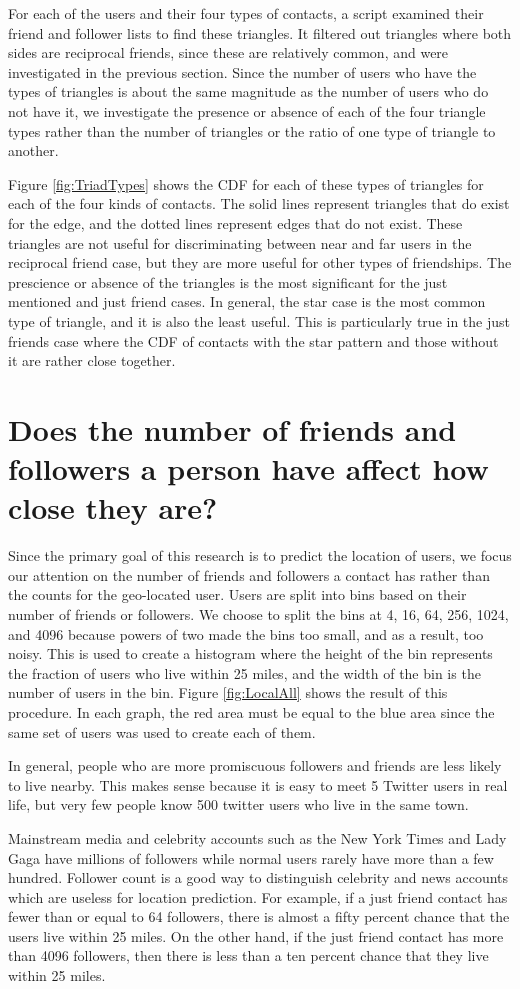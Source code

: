 For each of the users and their four types of contacts, a script examined their
friend and follower lists to find these triangles.
It filtered out triangles where both sides are reciprocal friends, since these
are relatively common, and were investigated in the previous section.
Since the number of users who have the types of triangles is about the same
magnitude as the number of users who do not have it, we investigate the
presence or absence of each of the four triangle types rather than the number
of triangles or the ratio of one type of triangle to another.

Figure \ref{fig:TriadTypes} shows the CDF for each of these types of triangles
for each of the four kinds of contacts.
The solid lines represent triangles that do exist for the edge, and the dotted
lines represent edges that do not exist.
These triangles are not useful for discriminating between near and far users in
the reciprocal friend case, but they are more useful for other types of
friendships.
The prescience or absence of the triangles is the most significant for the just
mentioned and just friend cases.
In general, the star case is the most common type of triangle, and it is also
the least useful.
This is particularly true in the just friends case where the CDF of contacts
with the star pattern and those without it are rather close together.

\section{Does the number of friends and followers a person have affect how
close they are?}

Since the primary goal of this research is to predict the location of users, we
focus our attention on the number of friends and followers a contact has rather
than the counts for the geo-located user. 
Users are split into bins based on their number of friends or followers.
We choose to split the bins at 4, 16, 64, 256, 1024, and 4096 because powers
of two made the bins too small, and as a result, too noisy.
This is used to create a histogram where the height of the bin represents the
fraction of users who live within 25 miles, and the width of the bin is the
number of users in the bin.
Figure \ref{fig:LocalAll} shows the result of this procedure.
In each graph, the red area must be equal to the blue area since the same set
of users was used to create each of them.

In general, people who are more promiscuous followers and friends are less
likely to live nearby. This makes sense because it is easy to meet 5 Twitter
users in real life, but very few people know 500 twitter users who live in the
same town.

Mainstream media and celebrity accounts such as the New York Times and Lady
Gaga have millions of followers while normal users rarely have more than a few
hundred.
Follower count is a good way to distinguish celebrity and news accounts which
are useless for location prediction.
For example, if a just friend contact has fewer than or equal to 64 followers,
there is almost a fifty percent chance that the users live within 25 miles. On
the other hand, if the just friend contact has more than 4096 followers, then
there is less than a ten percent chance that they live within 25 miles.
